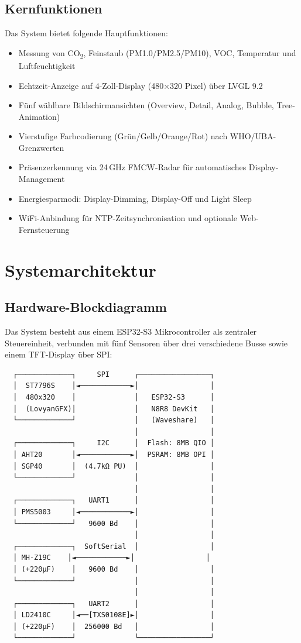 \documentclass[a4paper,11pt]{article}
\begin{document}
\subsection{Kernfunktionen}
Das System bietet folgende Hauptfunktionen:
\begin{itemize}[nosep]
\item Messung von CO\textsubscript{2}, Feinstaub (PM1.0/PM2.5/PM10), VOC, Temperatur und Luftfeuchtigkeit
\item Echtzeit-Anzeige auf 4-Zoll-Display (480$\times$320 Pixel) über LVGL 9.2
\item Fünf wählbare Bildschirmansichten (Overview, Detail, Analog, Bubble, Tree-Animation)
\item Vierstufige Farbcodierung (Grün/Gelb/Orange/Rot) nach WHO/UBA-Grenzwerten
\item Präsenzerkennung via 24\,GHz FMCW-Radar für automatisches Display-Management
\item Energiesparmodi: Display-Dimming, Display-Off und Light Sleep
\item WiFi-Anbindung für NTP-Zeitsynchronisation und optionale Web-Fernsteuerung
\end{itemize}

\section{Systemarchitektur}

\subsection{Hardware-Blockdiagramm}

Das System besteht aus einem ESP32-S3 Mikrocontroller als zentraler Steuereinheit, verbunden mit fünf Sensoren über drei verschiedene Busse sowie einem TFT-Display über SPI:

\begin{verbatim}
  ┌─────────────┐     SPI      ┌─────────────────┐
  │  ST7796S    │◄────────────►│                 │
  │  480x320    │              │   ESP32-S3      │
  │  (LovyanGFX)│              │   N8R8 DevKit   │
  └─────────────┘              │   (Waveshare)   │
                               │                 │
  ┌─────────────┐     I2C      │  Flash: 8MB QIO │
  │ AHT20       │◄────────────►│  PSRAM: 8MB OPI │
  │ SGP40       │  (4.7kΩ PU)  │                 │
  └─────────────┘              │                 │
                               │                 │
  ┌─────────────┐   UART1      │                 │
  │ PMS5003     │◄────────────►│                 │
  └─────────────┘   9600 Bd    │                 │
                               │                 │
  ┌─────────────┐  SoftSerial  │                 │
  │ MH-Z19C    │◄────────────►│                 │
  │ (+220µF)    │   9600 Bd    │                 │
  └─────────────┘              │                 │
                               │                 │
  ┌─────────────┐   UART2      │                 │
  │ LD2410C     │◄──[TXS0108E]►│                 │
  │ (+220µF)    │  256000 Bd   │                 │
  └─────────────┘              └─────────────────┘
\end{verbatim}
\end{document}
